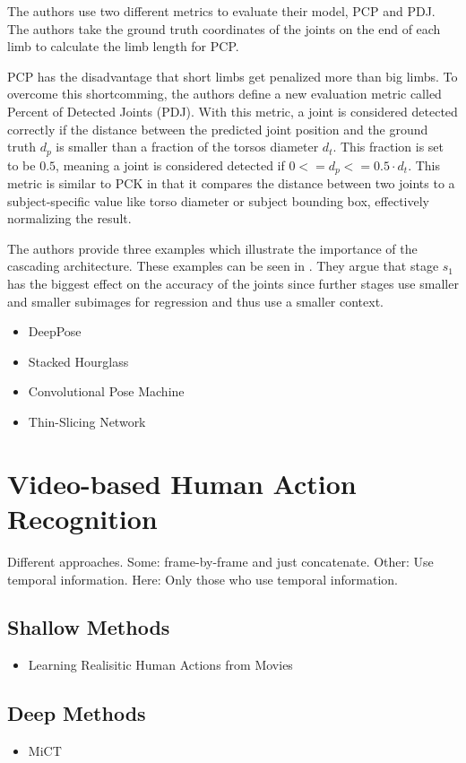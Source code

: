 The authors use two different metrics to evaluate their model, PCP and PDJ.
The authors take the ground truth coordinates of the joints on the end of each limb to calculate the limb length for PCP.

PCP has the disadvantage that short limbs get penalized more than big limbs.
To overcome this shortcomming, the authors define a new evaluation metric called Percent of Detected Joints (PDJ).
With this metric, a joint is considered detected correctly if the distance between the predicted joint position and the ground truth $d_p$ is smaller than a fraction of the torsos diameter $d_t$.
This fraction is set to be $0.5$, meaning a joint is considered detected if $0 <= d_p <= 0.5 \cdot d_t$.
This metric is similar to PCK in that it compares the distance between two joints to a subject-specific value like torso diameter or subject bounding box, effectively normalizing the result.

The authors provide three examples which illustrate the importance of the cascading architecture.
These examples can be seen in .
They argue that stage $s_1$ has the biggest effect on the accuracy of the joints since further stages use smaller and smaller subimages for regression and thus use a smaller context.

\begin{itemize}
    \item DeepPose \cite{toshev_deeppose:_2014}
    \item Stacked Hourglass \cite{newell_stacked_2016}
    \item Convolutional Pose Machine \cite{wei_convolutional_2016}
    \item Thin-Slicing Network \cite{song_thin-slicing_2017}
\end{itemize}

\section{Video-based Human Action Recognition}

Different approaches.
Some: frame-by-frame and just concatenate.
Other: Use temporal information.
Here: Only those who use temporal information.

\subsection{Shallow Methods}
\begin{itemize}
    \item Learning Realisitic Human Actions from Movies \cite{laptev_learning_2008}
\end{itemize}

\subsection{Deep Methods}
\begin{itemize}
    \item MiCT \cite{zhou_mict:_2018}
\end{itemize}